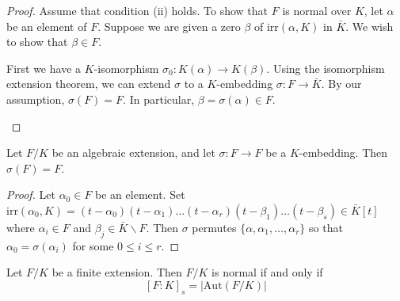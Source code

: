 \begin{proof}
Assume that condition (ii) holds. To show that $F$ is normal over $K$, let $\alpha $ be an element of $F$. Suppose we are given a zero $\beta $ of $\mathrm{irr}(\alpha ,K)$ in $\bar{K}$. We wish to show that $\beta \in F$.

\bigskip

First we have a $K$-isomorphism $\sigma_0:K(\alpha )\rightarrow K(\beta )$. Using the isomorphism extension theorem, we can extend $\sigma $ to a $K$-embedding $\sigma :F\rightarrow \bar{K}$. By our assumption, $\sigma (F)=F$. In particular, $\beta =\sigma (\alpha )\in F$.
\begin{center}
\end{center}

\end{proof}
\vspace{2ex}
\begin{lem}
Let $F/K$ be an algebraic extension, and let $\sigma :F\rightarrow F$ be a $K$-embedding. Then $\sigma (F)=F$.
\end{lem}
\vspace{2ex}
\begin{proof}
Let $\alpha _{0} \in F$ be an element. Set $\mathrm{irr}(\alpha_0 ,K)=(t-\alpha_0 )(t-\alpha_1)\ldots (t-\alpha_{r})(t-\beta_1)\ldots (t-\beta_{s})\in \bar{K}[t]$ where $\alpha _{i}\in F$ and $\beta _{j}\in \bar{K}\backslash F$. Then $\sigma $ permutes $\{\alpha,\alpha_1,\ldots ,\alpha _{r}\}$ so that $\alpha_0 =\sigma(\alpha _{i}) $ for some $0\leq i\leq r$. 
\end{proof}
\vspace{2ex}
\begin{rmk}
Let $F/K$ be a finite extension. Then $F/K$ is normal if and only if
\[[F:K]_{s}=|\mathrm{Aut}(F/K)|\]

\end{rmk}
\vspace{2ex}

